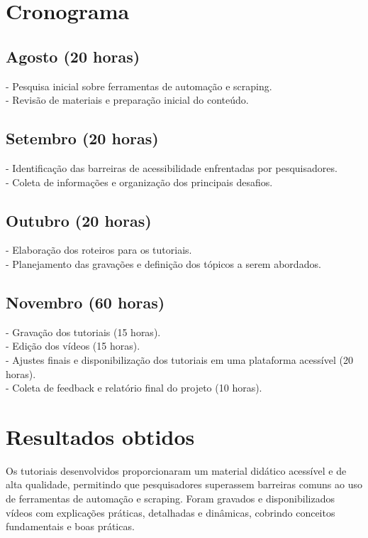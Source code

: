 \documentclass{article}
\begin{document}
\section*{Cronograma}
\subsection*{Agosto (20 horas)}
- Pesquisa inicial sobre ferramentas de automação e scraping.\\
- Revisão de materiais e preparação inicial do conteúdo.\\

\subsection*{Setembro (20 horas)}
- Identificação das barreiras de acessibilidade enfrentadas por pesquisadores.\\
- Coleta de informações e organização dos principais desafios.\\

\subsection*{Outubro (20 horas)}
- Elaboração dos roteiros para os tutoriais.\\
- Planejamento das gravações e definição dos tópicos a serem abordados.\\

\subsection*{Novembro (60 horas)}
- Gravação dos tutoriais (15 horas).\\
- Edição dos vídeos (15 horas).\\
- Ajustes finais e disponibilização dos tutoriais em uma plataforma acessível (20 horas).\\
- Coleta de feedback e relatório final do projeto (10 horas).\\

\section*{Resultados obtidos}
Os tutoriais desenvolvidos proporcionaram um material didático acessível e de alta qualidade, permitindo que pesquisadores superassem barreiras comuns ao uso de ferramentas de automação e scraping. Foram gravados e disponibilizados vídeos com explicações práticas, detalhadas e dinâmicas, cobrindo conceitos fundamentais e boas práticas.
\end{document}
